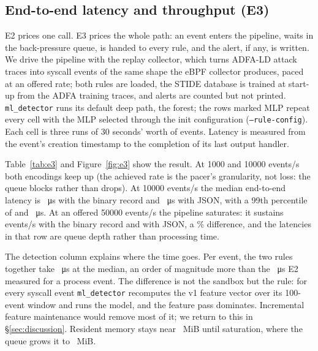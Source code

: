 \subsection{End-to-end latency and throughput (E3)}
\label{sec:eval:e3}
E2 prices one call. E3 prices the whole path: an event enters the pipeline,
waits in the back-pressure queue, is handed to every rule, and the alert, if
any, is written. We drive the pipeline with the replay collector, which
turns ADFA-LD attack traces into syscall events of the same shape the eBPF
collector produces, paced at an offered rate; both rules are loaded, the
STIDE database is trained at start-up from the ADFA training traces, and
alerts are counted but not printed. \texttt{ml\_detector} runs its default
deep path, the forest; the rows marked MLP repeat every cell with the MLP
selected through the init configuration (\texttt{--rule-config}). Each cell
is three runs of 30 seconds' worth of events. Latency is measured from the
event's creation timestamp to the completion of its last output handler.

Table~\ref{tab:e3} and Figure~\ref{fig:e3} show the result. At
\num{1000} and \num{10000} events/s both encodings keep up (the
achieved rate is the pacer's granularity, not loss: the queue blocks rather
than drops). At \num{10000} events/s the median end-to-end latency is
\eThreePFiftyBinTenKRf{}~\si{\micro\second} with the binary record and
\eThreePFiftyJsonTenKRf{}~\si{\micro\second} with JSON, with a 99th percentile
of \eThreePNinetyNineBinTenKRf{} and \eThreePNinetyNineJsonTenKRf{}~\si{\micro\second}.
At an offered \num{50000} events/s the pipeline saturates: it sustains
\eThreeAchievedBinFiftyKRf{} events/s with the binary record and
\eThreeAchievedJsonFiftyKRf{} with JSON, a \eThreeBinGainPctRf{}\% difference,
and the latencies in that row are queue depth rather than processing time.

The detection column explains where the time goes. Per event, the two rules
together take \eThreeDetectPFiftyBinTenKRf{}~\si{\micro\second} at the median,
an order of magnitude more than the \eTwoMlRawUs{}~\si{\micro\second} E2
measured for a process event. The difference is not the sandbox but the
rule: for every syscall event \texttt{ml\_detector} recomputes the v1
feature vector over its 100-event window and runs the model, and the feature
pass dominates. Incremental feature maintenance would remove most of it;
we return to this in \S\ref{sec:discussion}. Resident memory stays near
\eThreeRssMiBBinTenKRf{}~MiB until saturation, where the queue grows it to
\eThreeRssMiBBinFiftyKRf{}~MiB.

